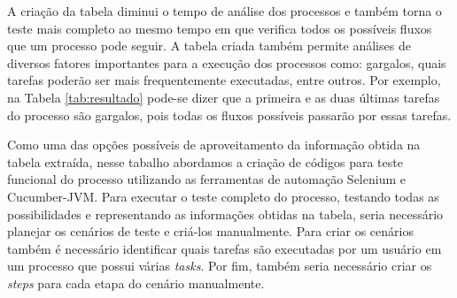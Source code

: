 \documentclass[12pt]{article}
\begin{document}
\begin{table}[]
\centering
\caption{Tabela obtida através do arquivo BPMN}
\label{tab:resultado}
\end{table}

A criação da tabela diminui o tempo de análise dos processos e também torna o teste mais completo ao mesmo tempo em que verifica todos os possíveis fluxos que um processo pode seguir. A tabela criada também permite análises de diversos fatores importantes para a execução dos processos como: gargalos, quais tarefas poderão ser mais frequentemente executadas, entre outros. Por exemplo, na Tabela \ref{tab:resultado} pode-se dizer que a primeira e as duas últimas tarefas do processo são gargalos, pois todas os fluxos possíveis passarão por essas tarefas. 

Como uma das opções possíveis de aproveitamento da informação obtida na tabela extraída, nesse tabalho abordamos a criação de códigos para teste funcional do processo utilizando as ferramentas de automação Selenium e Cucumber-JVM. Para executar o teste completo do processo, testando todas as possibilidades e representando as informações obtidas na tabela, seria necessário planejar os cenários de teste e criá-los manualmente. Para criar os cenários também é necessário identificar quais tarefas são executadas por um usuário em um processo que possui várias \emph{tasks}. Por fim, também seria necessário criar os \emph{steps} para cada etapa do cenário manualmente.
 
\end{document}

